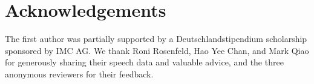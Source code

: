 \documentclass[11pt]{article}
\begin{document}

%

\section*{Acknowledgements}
\label{sec:thanks}
%

The first author was partially supported by a Deutschlandstipendium scholarship sponsored by IMC AG. 
We thank Roni Rosenfeld, Hao Yee Chan, and Mark Qiao for 
generously sharing their speech data and valuable advice, and
the three anonymous reviewers for their feedback.

%
%


\end{document}
